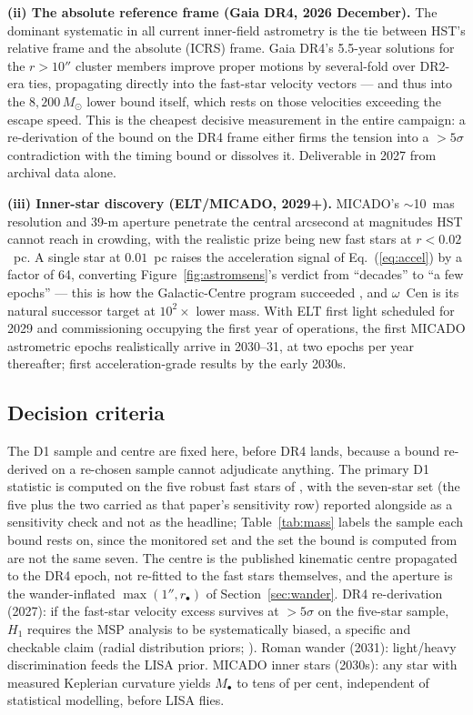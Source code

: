 \documentclass[11pt]{article}
\newcommand{\msun}{\ensuremath{M_\odot}}
\newcommand{\ocen}{\ensuremath{\omega}~Cen}
\begin{document}
\textbf{(ii) The absolute reference frame (Gaia DR4, 2026 December).} The dominant systematic in all current inner-field astrometry is the tie between HST's relative frame and the absolute (ICRS) frame. Gaia DR4's 5.5-year solutions for the $r > 10''$ cluster members \citep{GaiaMission2016,GaiaDR4DPAC2026} improve proper motions by several-fold over DR2-era ties, propagating directly into the fast-star velocity vectors --- and thus into the $8{,}200\,\msun$ lower bound itself, which rests on those velocities exceeding the escape speed. This is the cheapest decisive measurement in the entire campaign: a re-derivation of the \citet{Haberle2024Nature} bound on the DR4 frame either firms the tension into a $>5\sigma$ contradiction with the timing bound or dissolves it. Deliverable in 2027 from archival data alone.

\textbf{(iii) Inner-star discovery (ELT/MICADO, 2029+).} MICADO's $\sim$10~mas resolution and 39-m aperture \citep{Davies2021} penetrate the central arcsecond at magnitudes HST cannot reach in crowding, with the realistic prize being new fast stars at $r < 0.02$~pc. A single star at $0.01$~pc raises the acceleration signal of Eq.~(\ref{eq:accel}) by a factor of 64, converting Figure~\ref{fig:astromsens}'s verdict from ``decades'' to ``a few epochs'' --- this is how the Galactic-Centre program succeeded \citep{GRAVITY2018}, and \ocen{} is its natural successor target at $10^{2}\times$ lower mass. With ELT first light scheduled for 2029 and commissioning occupying the first year of operations, the first MICADO astrometric epochs realistically arrive in 2030--31, at two epochs per year thereafter; first acceleration-grade results by the early 2030s.

\subsection{Decision criteria}

The D1 sample and centre are fixed here, before DR4 lands, because a bound re-derived on a re-chosen sample cannot adjudicate anything. The primary D1 statistic is computed on the five robust fast stars of \citet{Haberle2024Nature}, with the seven-star set (the five plus the two carried as that paper's sensitivity row) reported alongside as a sensitivity check and not as the headline; Table~\ref{tab:mass} labels the sample each bound rests on, since the monitored set and the set the bound is computed from are not the same seven. The centre is the published kinematic centre propagated to the DR4 epoch, not re-fitted to the fast stars themselves, and the aperture is the wander-inflated $\max(1'', r_{\bullet})$ of Section~\ref{sec:wander}. DR4 re-derivation (2027): if the fast-star velocity excess survives at $>5\sigma$ on the five-star sample, $H_1$ requires the MSP analysis to be systematically biased, a specific and checkable claim (radial distribution priors; \citealt{BanaresHernandez2025}). Roman wander (2031): light/heavy discrimination feeds the LISA prior. MICADO inner stars (2030s): any star with measured Keplerian curvature yields $M_{\bullet}$ to tens of per cent, independent of statistical modelling, before LISA flies.
\end{document}
